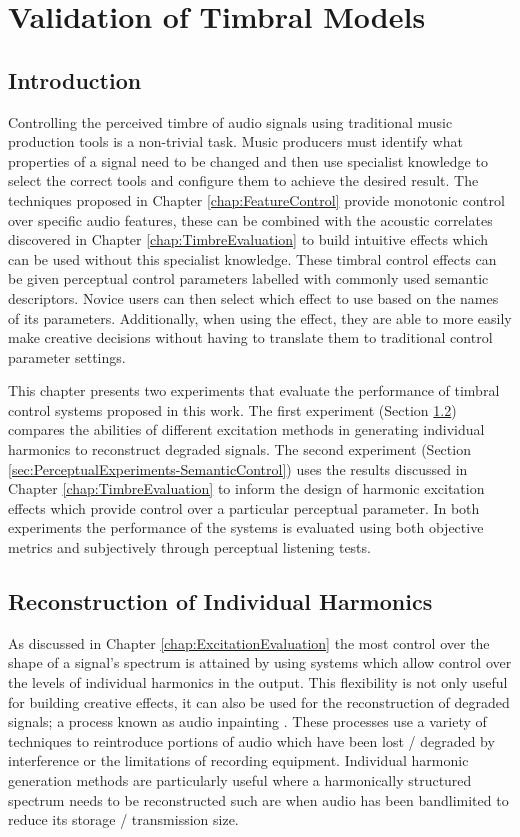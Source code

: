 \chapter{Validation of Timbral Models}
\label{chap:PerceptualExperiments}

\section{Introduction}
\label{sec:PerceptualExperiments-Introduction}
	Controlling the perceived timbre of audio signals using traditional music production tools is a non-trivial task.
	Music producers must identify what properties of a signal need to be changed and then use specialist knowledge to
	select the correct tools and configure them to achieve the desired result. The techniques proposed in Chapter
	\ref{chap:FeatureControl} provide monotonic control over specific audio features, these can be combined with the
	acoustic correlates discovered in Chapter \ref{chap:TimbreEvaluation} to build intuitive effects which can be used
	without this specialist knowledge. These timbral control effects can be given perceptual control parameters
	labelled with commonly used semantic descriptors. Novice users can then select which effect to use based on the
	names of its parameters. Additionally, when using the effect, they are able to more easily make creative decisions
	without having to translate them to traditional control parameter settings.

	This chapter presents two experiments that evaluate the performance of timbral control systems proposed in this
	work. The first experiment (Section \ref{sec:PerceptualExperiments-Reconstruction}) compares the abilities of
	different excitation methods in generating individual harmonics to reconstruct degraded signals. The second
	experiment (Section \ref{sec:PerceptualExperiments-SemanticControl}) uses the results discussed in Chapter
	\ref{chap:TimbreEvaluation} to inform the design of harmonic excitation effects which provide control over a
	particular perceptual parameter. In both experiments the performance of the systems is evaluated using both
	objective metrics and subjectively through perceptual listening tests.

\section{Reconstruction of Individual Harmonics}
\label{sec:PerceptualExperiments-Reconstruction}
	As discussed in Chapter \ref{chap:ExcitationEvaluation} the most control over the shape of a signal's spectrum is
	attained by using systems which allow control over the levels of individual harmonics in the output. This
	flexibility is not only useful for building creative effects, it can also be used for the reconstruction of
	degraded signals; a process known as audio inpainting \citep{adler2012audio}. These processes use a variety of
	techniques to reintroduce portions of audio which have been lost / degraded by interference or the limitations of
	recording equipment. Individual harmonic generation methods are particularly useful where a harmonically structured
	spectrum needs to be reconstructed such are when audio has been bandlimited to reduce its storage / transmission
	size.

